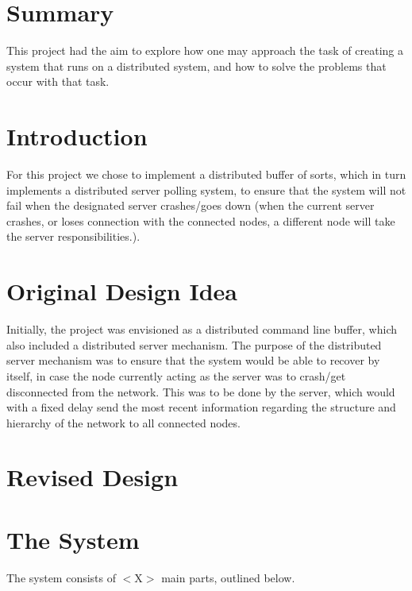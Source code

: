 \documentclass[12pt]{article}
\begin{document}
\section{Summary} %
\label{sec:summary}
This project had the aim to explore how one may approach the task of creating a system that runs on a distributed system, and how to solve the problems that occur with that task.

\section{Introduction} %
\label{sec:introduction}
For this project we chose to implement a distributed buffer of sorts, which in turn implements a distributed server polling system, to ensure that the system will not fail when the designated server crashes/goes down (when the current server crashes, or loses connection with the connected nodes, a different node will take the server responsibilities.).

\section{Original Design Idea} %
\label{sec:original_design_idea}

Initially, the project was envisioned as a distributed command line buffer, which also included a distributed server mechanism. The purpose of the distributed server mechanism was to ensure that the system would be able to recover by itself, in case the node currently acting as the server was to crash/get disconnected from the network. This was to be done by the server, which would with a fixed delay send the most recent information regarding the structure and hierarchy of the network to all connected nodes.

\section{Revised Design} %
\label{sec:revised_design}




\section{The System} %
\label{sec:the_system}
The system consists of $<$X$>$ main parts, outlined below.
\end{document}
